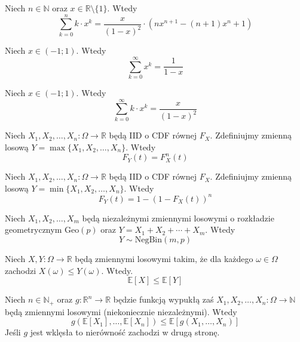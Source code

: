\begin{fact}\label{F:geo_1}
Niech $n\in\mathbb{N}$ oraz $x\in\mathbb{R}\setminus\{1\}$. Wtedy
\[
    \sum_{k=0}^{n} k\cdot x^k=\frac{x}{(1-x)^2}\cdot (nx^{n+1}-(n+1)x^n+1)
\]
\end{fact}

\begin{fact}\label{F:geo_0_inf}
Niech $x\in (-1;1)$. Wtedy
\[
    \sum_{k=0}^{\infty} x^k = \frac{1}{1-x}
\]
\end{fact}

\begin{fact}\label{F:geo_1_inf}
Niech $x\in (-1;1)$. Wtedy
\[
    \sum_{k=0}^{\infty} k\cdot x^k=\frac{x}{(1-x)^2}
\]
\end{fact}

\begin{fact}\label{F:max_CDF}
Niech $X_1,X_2,\dots, X_n:\Omega\to\mathbb{R}$ będą IID o CDF równej $F_X$. Zdefiniujmy zmienną losową $Y = \max\{X_1,X_2,\dots, X_n\}$. Wtedy 
\[
    F_Y(t)=F_X^n(t)
\]
\end{fact}

\begin{fact}\label{F:min_CDF}
Niech $X_1,X_2,\dots, X_n:\Omega\to\mathbb{R}$ będą IID o CDF równej $F_X$. Zdefiniujmy zmienną losową $Y = \min\{X_1,X_2,\dots, X_n\}$. Wtedy 
\[
    F_Y(t)=1-(1-F_X(t))^n
\]
\end{fact}

\begin{fact}\label{F:sum_of_geo_RV}
Niech $X_1, X_2, \dots, X_m$ będą niezależnymi zmiennymi losowymi o rozkładzie geometrycznym $\mathrm{Geo}(p)$ oraz $Y=X_1 + X_2 + \cdots + X_m$. Wtedy 
\[
    Y \sim \mathrm{NegBin}(m, p)
\]
\end{fact}


\begin{fact}\label{F:montonicity_of_expectation}
Niech $X,Y:\Omega\to\mathbb{R}$ będą zmiennymi losowymi takim, że dla każdego $\omega\in\Omega$ zachodzi $X(\omega)\le Y(\omega)$. Wtedy. 
\[
    \mathbb{E}[X] \le \mathbb{E}[Y]
\]
\end{fact}

\begin{fact}\label{F:Jensen} 
Niech $n\in\mathbb{N}_+$ oraz $g:\mathbb{R}^n\to\mathbb{R}$ będzie funkcją wypukłą zaś $X_1,X_2,\dots, X_n:\Omega\to\mathbb{N}$ będą zmiennymi losowymi (niekoniecznie niezależnymi). Wtedy
\[
    g(\mathbb{E}[X_1],\dots, \mathbb{E}[X_n]) \le \mathbb{E}[g(X_1,\dots,X_n)]
\]
Jeśli $g$ jest wklęsła to nierówność zachodzi w drugą stronę.
\end{fact}